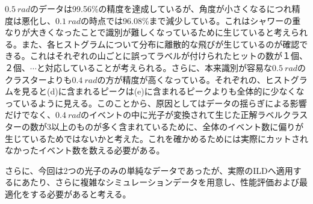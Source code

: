 $\SI{0.5}{rad}$のデータは99.56\%の精度を達成しているが、角度が小さくなるにつれ精度は悪化し、$\SI{0.1}{rad}$の時点では96.08\%まで減少している。これはシャワーの重なりが大きくなったことで識別が難しくなっているために生じていると考えられる。また、各ヒストグラムについて分布に離散的な飛びが生じているのが確認できる。これはそれぞれの山ごとに誤ってラベルが付けられたヒットの数が１個、２個、$\cdots$と対応していることが考えられる。さらに、本来識別が容易な$\SI{0.5}{rad}$のクラスターよりも$\SI{0.4}{rad}$の方が精度が高くなっている。それぞれの、ヒストグラムを見ると(d)に含まれるピークは(e)に含まれるピークよりも全体的に少なくなっているように見える。このことから、原因としてはデータの揺らぎによる影響だけでなく、$\SI{0.4}{rad}$のイベントの中に光子が変換されて生じた正解ラベルクラスターの数が3以上のものが多く含まれているために、全体のイベント数に偏りが生じているためではないかと考えた。これを確かめるためには実際にカットされなかったイベント数を数える必要がある。

さらに、今回は2つの光子のみの単純なデータであったが、実際のILDへ適用するにあたり、さらに複雑なシミュレーションデータを用意し、性能評価および最適化をする必要があると考える。


